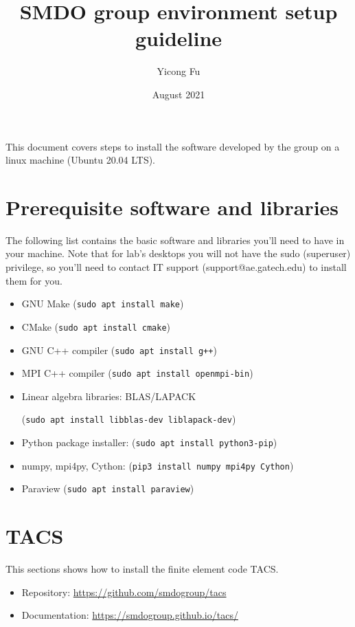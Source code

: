 \documentclass{article}
\title{SMDO group environment setup guideline}
\author{Yicong Fu}
\date{August 2021}
\begin{document}
\maketitle

This document covers steps to install the software developed by the group on
a linux machine (Ubuntu 20.04 LTS).

\section{Prerequisite software and libraries}

The following list contains the basic software and libraries you'll need
to have in your machine. Note that for lab's desktops you will not have the
sudo (superuser) privilege, so you'll need to contact IT support
(support@ae.gatech.edu) to install them for you.

\begin{itemize}
    \item GNU Make (\texttt{sudo apt install make})
    \item CMake (\texttt{sudo apt install cmake})
    \item GNU C++ compiler (\texttt{sudo apt install g++})
    \item MPI C++ compiler (\texttt{sudo apt install openmpi-bin})
    \item Linear algebra libraries: BLAS/LAPACK

    (\texttt{sudo apt install libblas-dev liblapack-dev})

    \item Python package installer: (\texttt{sudo apt install python3-pip})
    \item numpy, mpi4py, Cython: (\texttt{pip3 install numpy mpi4py Cython})
    \item Paraview (\texttt{sudo apt install paraview})

\end{itemize}
\section{TACS}

This sections shows how to install the finite element code TACS.

\begin{itemize}
    \item Repository: \href{https://github.com/smdogroup/tacs}{https://github.com/smdogroup/tacs}
    \item Documentation: \href{https://smdogroup.github.io/tacs/}{https://smdogroup.github.io/tacs/}
\end{itemize}
\end{document}
